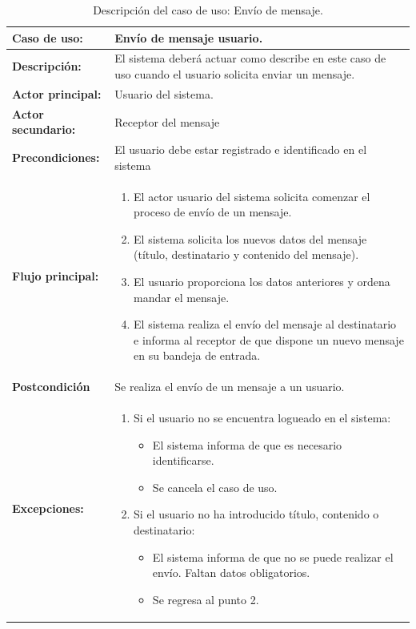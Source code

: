 \begin{table}[H]
  \begin{center}
    \begin{tabular}{|p{3.5cm}|p{10cm}|}
      \hline
      {\textbf{Caso de uso:}} & { Envío de mensaje usuario.} \\
      \hline
      {\textbf{Descripción:}} & { El sistema deberá actuar como describe en este caso de uso cuando el usuario solicita enviar un mensaje.} \\
     \hline
      {\textbf{Actor principal:}} & { Usuario del sistema.} \\
      \hline
      {\textbf{Actor secundario:}} & { Receptor del mensaje } \\
      \hline
      {\textbf{Precondiciones:}} & { El usuario debe estar registrado e identificado en el sistema } \\
     \hline   
    {\textbf{Flujo principal:}} & { 
      \begin{enumerate}
	\item El actor usuario del sistema solicita comenzar el proceso de envío de un mensaje.
	\item El sistema solicita los nuevos datos del mensaje (título, destinatario y contenido del mensaje).
	\item El usuario proporciona los datos anteriores y ordena mandar el mensaje.
	\item El sistema realiza el envío del mensaje al destinatario e informa al receptor de que dispone un nuevo mensaje en su bandeja de entrada.
      \end{enumerate}
      } \\
     \hline
     {\textbf{Postcondición}} & {Se realiza el envío de un mensaje a un usuario.}\\
     \hline
     
      {\textbf{Excepciones:}} & {
	\begin{enumerate}
	\item Si el usuario no se encuentra logueado en el sistema:
	\begin{itemize}
	  \item El sistema informa de que es necesario identificarse.
	  \item Se cancela el caso de uso.
	\end{itemize}
	\item Si el usuario no ha introducido título, contenido o destinatario:
	  \begin{itemize}
	    \item El sistema informa de que no se puede realizar el envío. Faltan datos obligatorios.
	    \item Se regresa al punto 2.
	  \end{itemize}
	\end{enumerate}
	}\\
      \hline
    \end{tabular}
  \end{center}
\caption{Descripción del caso de uso: Envío de mensaje.}
\end{table}


